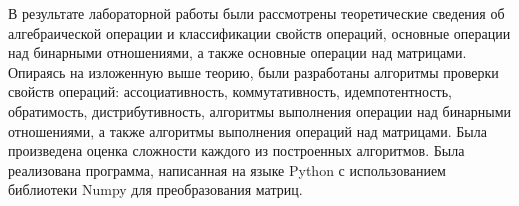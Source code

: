 \documentclass[bachelor, och, labwork]{shiza}
\begin{document}
        \newpage
 
    \conclusion
    
    В результате лабораторной работы были рассмотрены теоретические сведения об алгебраической операции и классификации
    свойств операций, основные операции над бинарными отношениями, а также основные операции над матрицами. Опираясь на изложенную
    выше теорию, были разработаны алгоритмы проверки свойств операций: ассоциативность, коммутативность, идемпотентность, обратимость,
    дистрибутивность, алгоритмы выполнения операции над бинарными отношениями, а также алгоритмы выполнения операций над
    матрицами. Была произведена оценка сложности каждого из  построенных алгоритмов. Была реализована программа, написанная на языке Python
    с использованием библиотеки Numpy для преобразования матриц.
    
\end{document}
